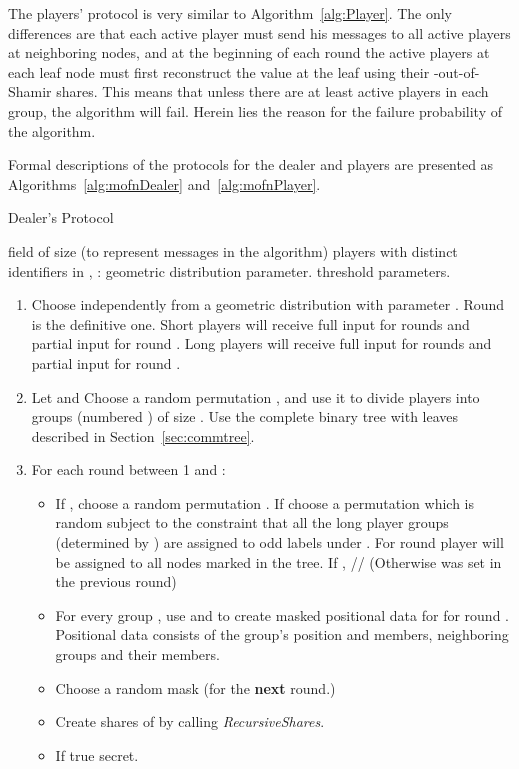 \documentclass[12pt]{article}
\theoremstyle{definition}
\newcommand{\recursiveShares}{\emph{RecursiveShares}\xspace}
\begin{document}
The players' protocol is very similar to Algorithm~\ref{alg:Player}. The only 
differences are that each active player must send his messages to all active 
players at neighboring nodes, and at the beginning of each round the active 
players at each leaf node must first reconstruct the value at the leaf using 
their -out-of- Shamir shares. This means that unless 
there are at least  active players in each group, the algorithm 
will fail. Herein lies the reason for the  failure probability of the 
algorithm.

Formal descriptions of the protocols for the dealer and players are presented 
as Algorithms~\ref{alg:mofnDealer} and~\ref{alg:mofnPlayer}.

\begin{algorithm}
{\small
\caption{Dealer's Protocol} \label{alg:mofnDealer} 
 field of size  (to represent messages in the algorithm)
 players with distinct identifiers in ,
: geometric distribution parameter.
 threshold parameters.
\begin{enumerate}
\item Choose  independently from a geometric distribution with 
parameter . Round  is the definitive one. Short players will receive 
full input for  rounds and partial input for round . Long players 
will receive full input for  rounds and partial input for round . 
\item Let  and 
Choose a random permutation , and use it to divide players into 
 groups (numbered ) of size . Use the complete 
binary tree with  leaves described in Section~\ref{sec:commtree}.
\item For each round  between 1 and :
\begin{itemize}
\item If , choose a random permutation . 
If  choose a permutation  which is random subject to the 
constraint that all the long player groups (determined by ) are assigned 
to odd labels under . For round  player  will be assigned to 
all nodes marked  in the tree. If ,  // (Otherwise 
 was set in the previous round)
\item For every group , use  and  to create masked positional 
data for  for round . Positional data consists of the group's position 
and members, neighboring groups and their members.
\item Choose a random mask  (for the {\bf next} round.)
\item Create shares of  by calling 
\recursiveShares.
\item If   true secret.\\

\end{itemize}
\end{enumerate}}
\end{algorithm}
\end{document}
